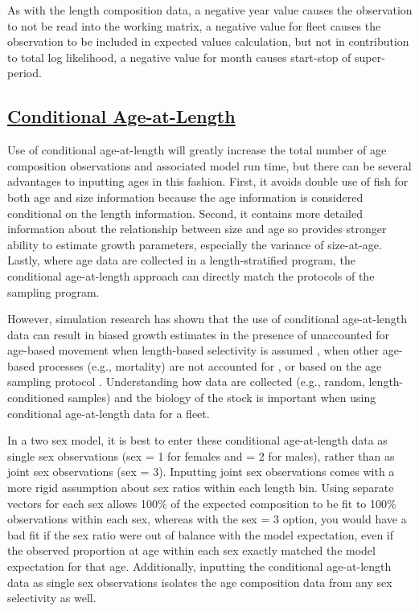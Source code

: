 As with the length composition data, a negative year value causes the observation to not be read into the working matrix, a negative value for fleet causes the observation to be included in expected values calculation, but not in contribution to total log likelihood, a negative value for month causes start-stop of super-period.

\hypertarget{CondAatL}{}
\subsection[Conditional Age-at-Length]{\protect\hyperlink{CondAatL}{Conditional Age-at-Length}}
Use of conditional age-at-length will greatly increase the total number of age composition observations and associated model run time, but there can be several advantages to inputting ages in this fashion. First, it avoids double use of fish for both age and size information because the age information is considered conditional on the length information. Second, it contains more detailed information about the relationship between size and age so provides stronger ability to estimate growth parameters, especially the variance of size-at-age. Lastly, where age data are collected in a length-stratified program, the conditional age-at-length approach can directly match the protocols of the sampling program.

However, simulation research has shown that the use of conditional age-at-length data can result in biased growth estimates in the presence of unaccounted for age-based movement when length-based selectivity is assumed \citep{lee-effects-2017}, when other age-based processes (e.g., mortality) are not accounted for \citep{lee-use-2019}, or based on the age sampling protocol \citep{piner-evaluation-2016}. Understanding how data are collected (e.g., random, length-conditioned samples) and the biology of the stock is important when using conditional age-at-length data for a fleet.     

In a two sex model, it is best to enter these conditional age-at-length data as single sex observations (sex = 1 for females and = 2 for males), rather than as joint sex observations (sex = 3). Inputting joint sex observations comes with a more rigid assumption about sex ratios within each length bin. Using separate vectors for each sex allows 100\% of the expected composition to be fit to 100\% observations within each sex, whereas with the sex = 3 option, you would have a bad fit if the sex ratio were out of balance with the model expectation, even if the observed proportion at age within each sex exactly matched the model expectation for that age. Additionally, inputting the conditional age-at-length data as single sex observations isolates the age composition data from any sex selectivity as well.

